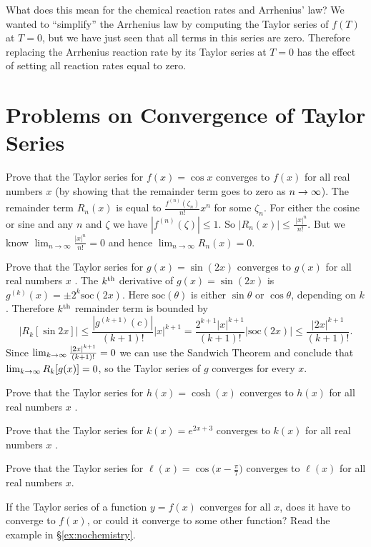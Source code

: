 What does this mean for the chemical reaction rates and Arrhenius' law?  We
wanted to ``simplify'' the Arrhenius law by computing the Taylor series of
$f(T)$ at $T=0$, but we have just seen that all terms in this series are
zero.  Therefore replacing the Arrhenius reaction rate by its Taylor series
at $T=0$ has the effect of setting all reaction rates equal to zero.

\section{Problems on Convergence of Taylor Series} %

\begin{multicols}{2}
\problem Prove that the Taylor series for $f (x) = \cos x$ converges to %
$f(x)$ for all real numbers $x$ (by showing that the remainder term goes
to zero as $n\to\infty$).
\answer The remainder term $R_n(x)$ is equal to %
$\frac {f^{(n)}(\zeta_n)}{n!}x^n$ for some $\zeta_n$.
For either the cosine or sine and any $n$ and $\zeta$
we have $|{f^{(n)}(\zeta)}|\leq 1$.  So
$|R_n(x)|\leq \frac{\;|x|^n}{n!}$. But we know
$\lim_{n\to\infty} \frac{|x|^n}{n!} =0$ and hence
$\lim_{n\to\infty} R_n(x) =0$.
\endanswer


\problem Prove that the Taylor series for \(g(x) = \sin(2x) \) converges %
to $g(x)$ for all real numbers $x$ .
\answer\def\soc{\mathrm{soc}}%
The $k^{\rm th}$ derivative of $g(x) = \sin(2x)$ is $g^{(k)}(x) = \pm
2^k \soc(2x)$.  Here $\soc(\theta)$ is either $\sin \theta$ or $\cos
\theta$, depending on $k$.  Therefore $k^{\rm th}$ remainder term is
bounded by
\[
|R_k[\sin 2x]| \leq \frac{|g^{(k+1)}(c)|} {(k+1)!}|x|^{k+1} =\frac
{2^{k+1}|x|^{k+1}}{(k+1)!} |\soc (2x)| \leq \frac{|2x|^{k+1}} {(k+1)!}.
\]
Since $\lim_{k\to\infty} \frac{|2x|^{k+1}} {(k+1)!} = 0$ we can use the
Sandwich Theorem and conclude that $\lim_{k\to\infty}R_k[g(x)] = 0$, so the
Taylor series of $g$ converges for every $x$.
\endanswer

\problem Prove that the Taylor series for \(h(x) = \cosh(x)\) converges %
to $h(x)$ for all real numbers $x$ .

\problem Prove that the Taylor series for \(k(x) = e^{2x+3} \) converges %
to $k(x)$ for all real numbers $x$ .

\problem Prove that the Taylor series for \(\ell(x) = %
\cos\bigl(x-\frac{\pi}{7}\bigr)\) converges to $\ell(x)$ for all real
numbers $x$.

\problem \groupproblem  If the Taylor series of a function $y=f(x)$ converges for all %
$x$, does it have to converge to $f(x)$, or could it converge to some
other function?
\answer %
Read the example in \S\ref{ex:nochemistry}.
\endanswer


\end{multicols}

